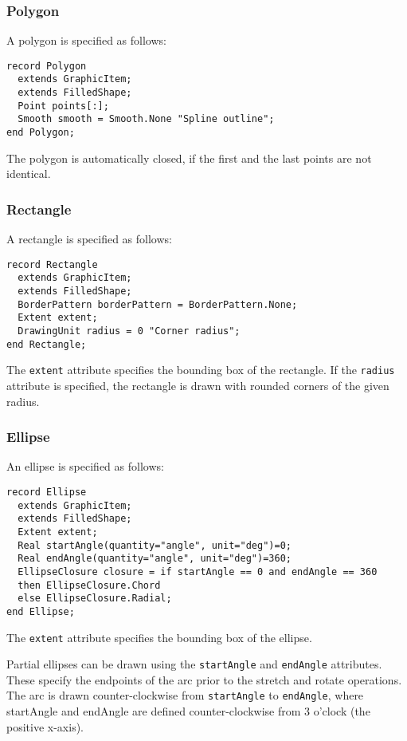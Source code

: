 \subsubsection{Polygon}\label{polygon}

A polygon is specified as follows:
\begin{lstlisting}[language=modelica]
record Polygon
  extends GraphicItem;
  extends FilledShape;
  Point points[:];
  Smooth smooth = Smooth.None "Spline outline";
end Polygon;
\end{lstlisting}
The polygon is automatically closed, if the first and the last points
are not identical.

\subsubsection{Rectangle}\label{rectangle}

A rectangle is specified as follows:
\begin{lstlisting}[language=modelica]
record Rectangle
  extends GraphicItem;
  extends FilledShape;
  BorderPattern borderPattern = BorderPattern.None;
  Extent extent;
  DrawingUnit radius = 0 "Corner radius";
end Rectangle;
\end{lstlisting}
The \lstinline!extent! attribute specifies the bounding box of the rectangle. If the
\lstinline!radius! attribute is specified, the rectangle is drawn with rounded
corners of the given radius.

\subsubsection{Ellipse}\label{ellipse}

An ellipse is specified as follows:
\begin{lstlisting}[language=modelica]
record Ellipse
  extends GraphicItem;
  extends FilledShape;
  Extent extent;
  Real startAngle(quantity="angle", unit="deg")=0;
  Real endAngle(quantity="angle", unit="deg")=360;
  EllipseClosure closure = if startAngle == 0 and endAngle == 360
  then EllipseClosure.Chord
  else EllipseClosure.Radial;
end Ellipse;
\end{lstlisting}
The \lstinline!extent! attribute specifies the bounding box of the ellipse.

Partial ellipses can be drawn using the \lstinline!startAngle! and \lstinline!endAngle!
attributes. These specify the endpoints of the arc prior to the stretch
and rotate operations. The arc is drawn counter-clockwise from
\lstinline!startAngle! to \lstinline!endAngle!, where startAngle and endAngle are defined
counter-clockwise from 3 o'clock (the positive x-axis).

